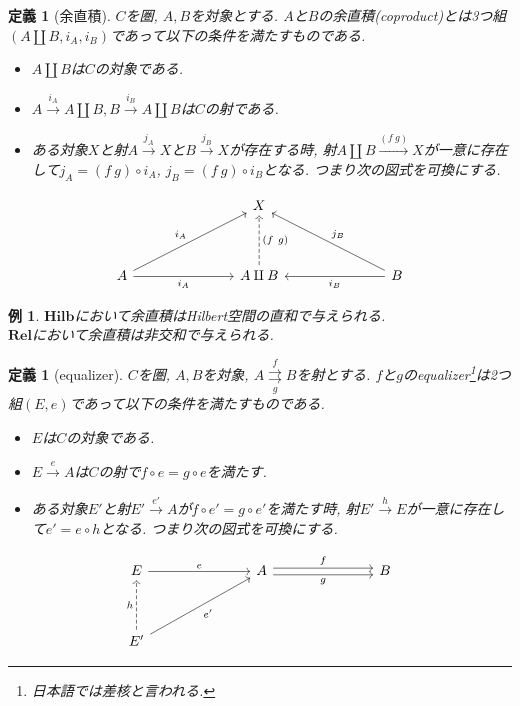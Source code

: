 \documentclass[a4paper,12pt]{ltjsarticle}
\theoremstyle{break}
\newtheorem{defn}[thm]{定義}
\newtheorem{eg}[thm]{例}
\newcommand{\rel}{\mathbf{Rel}}
\newcommand{\hilb}{\mathbf{Hilb}}
\newcommand{\xr}[1]{\xrightarrow{#1}}
\newcommand{\ci}{\circ}
\newcommand{\am}{\amalg}
\numberwithin{equation}{section}
\begin{document}
\begin{defn}[余直積]
  $C$を圏, $A, B$を対象とする. 
  $A$と$B$の余直積(coproduct)とは3つ組$(A \am B, i_A, i_B)$であって以下の条件を満たすものである.
  \begin{itemize} 
    \item $A \am B$は$C$の対象である. 
    \item $A \xr{i_A} A \am B, B \xr{i_B} A \am B$は$C$の射である. 
    \item ある対象$X$と射$A \xr{j_A} X$と$B \xr{j_B} X$が存在する時, 射$A \am B \xr{(f~g)} X$が一意に存在して$j_A = (f~g) \ci i_A$, $j_B = (f~g) \ci i_B$となる. 
    つまり次の図式を可換にする. 
  \end{itemize}   
  \[\begin{tikzcd}
    &&& X \\
    \\
    A &&& {A \am B} &&& B
    \arrow["{(f~g)}"', dashed,  from=3-4, to=1-4]
    \arrow["{i_A}", from=3-1, to=1-4]
    \arrow["{i_A}"', from=3-1, to=3-4]
    \arrow["{j_B}"', from=3-7, to=1-4]
    \arrow["{i_B}", from=3-7, to=3-4]
  \end{tikzcd}\]
\end{defn}

\begin{eg}
  $\hilb$において余直積はHilbert空間の直和で与えられる. \\
  $\rel$において余直積は非交和で与えられる. 
\end{eg}

\begin{defn}[equalizer]
  $C$を圏, $A, B$を対象, $A \overset{f}{\underset{g}{\rightrightarrows}} B$を射とする. 
  $f$と$g$のequalizer\footnote{日本語では差核と言われる.}は2つ組$(E, e)$であって以下の条件を満たすものである. 
  \begin{itemize}
    \item $E$は$C$の対象である. 
    \item $E \xr{e} A$は$C$の射で$f \ci e = g \ci e$を満たす. 
    \item ある対象$E'$と射$E' \xr{e'} A$が$f \ci e' = g \ci e'$を満たす時, 射$E' \xr{h} E$が一意に存在して$e' = e \ci h$となる. 
    つまり次の図式を可換にする. 
  \end{itemize}
  \[\begin{tikzcd}
	  E &&& A &&& B \\
	  \\
	  {E'}
	  \arrow["g"', shift right=1, from=1-4, to=1-7]
	  \arrow["{e'}"', from=3-1, to=1-4]
	  \arrow["e", from=1-1, to=1-4]
	  \arrow["h", from=3-1, dashed, to=1-1]
	  \arrow["f", shift left=1, from=1-4, to=1-7]
  \end{tikzcd}\]
\end{defn}
\end{document}
